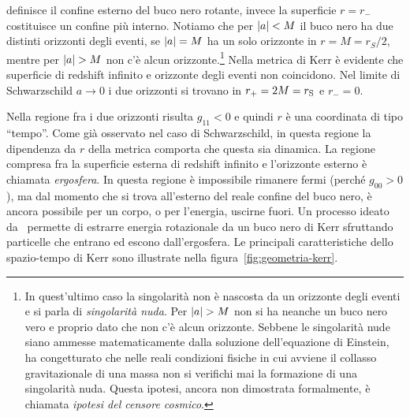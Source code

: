 definisce il confine esterno del buco nero rotante, invece la superficie \(r =
r_{-}\) costituisce un confine più interno.  Notiamo che per \(\lvert a\rvert < M\) il
buco nero ha due distinti orizzonti degli eventi, se \(\lvert a\rvert = M\) ha un solo
orizzonte in \(r = M = r_{S}/2\), mentre per \(\lvert a\rvert > M\) non c'è alcun
orizzonte.\footnote{In quest'ultimo caso la singolarità non è nascosta da un
  orizzonte degli eventi e si parla di \emph{singolarità nuda}.  Per \(\lvert a\rvert >
  M\) non si ha neanche un buco nero vero e proprio dato che non c'è alcun
  orizzonte.  Sebbene le singolarità nude siano ammesse matematicamente dalla
  soluzione dell'equazione di Einstein, \textcite{1969NCimR...1..252P} ha
  congetturato che nelle reali condizioni fisiche in cui avviene il collasso
  gravitazionale di una massa non si verifichi mai la formazione di una
  singolarità nuda.  Questa ipotesi, ancora non dimostrata formalmente, è
  chiamata \emph{ipotesi del censore cosmico}.}  Nella metrica di Kerr è
evidente che superficie di redshift infinito e orizzonte degli eventi non
coincidono.  Nel limite di Schwarzschild \(a\to 0\) i due orizzonti si trovano
in \(r_{+} = 2M = r_{\textup{S}}\) e \(r_{-} = 0\).

Nella regione fra i due orizzonti risulta \(g_{11} < 0\) e quindi \(r\) è una
coordinata di tipo ``tempo''.  Come già osservato nel caso di Schwarzschild, in
questa regione la dipendenza da \(r\) della metrica comporta che questa sia
dinamica.  La regione compresa fra la superficie esterna di redshift infinito e
l'orizzonte esterno è chiamata \emph{ergosfera}.  In questa regione è
impossibile rimanere fermi (perché \(g_{00} > 0\)), ma dal momento che si trova
all'esterno del reale confine del buco nero, è ancora possibile per un corpo, o
per l'energia, uscirne fuori.  Un processo ideato
da~\textcite{1969NCimR...1..252P} permette di estrarre energia rotazionale da un
buco nero di Kerr sfruttando particelle che entrano ed escono dall'ergosfera.
Le principali caratteristiche dello spazio-tempo di Kerr sono illustrate nella
figura~\ref{fig:geometria-kerr}.

